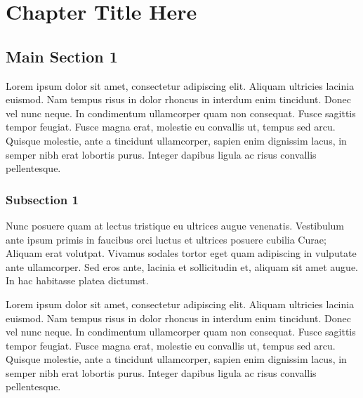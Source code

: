 
\chapter{Chapter Title Here} %

\label{Chapter2} %


\section{Main Section 1}

Lorem ipsum \cite{mwave,pozar,3s2b} dolor sit amet, consectetur adipiscing elit. Aliquam ultricies lacinia euismod. Nam tempus risus in dolor rhoncus in interdum enim tincidunt. Donec vel nunc neque. In condimentum ullamcorper quam non consequat. Fusce sagittis tempor feugiat. Fusce magna erat, molestie eu convallis ut, tempus sed arcu. Quisque molestie, ante a tincidunt ullamcorper, sapien enim dignissim lacus, in semper nibh erat lobortis purus. Integer dapibus ligula ac risus convallis pellentesque.

\subsection{Subsection 1}

\indent Nunc posuere quam at lectus tristique eu ultrices augue venenatis. Vestibulum ante ipsum primis in faucibus orci luctus et ultrices posuere cubilia Curae; Aliquam erat volutpat. Vivamus sodales tortor eget quam adipiscing in vulputate ante ullamcorper. Sed eros ante, lacinia et sollicitudin et, aliquam sit amet augue. In hac habitasse platea dictumst.

Lorem ipsum dolor sit amet, consectetur adipiscing elit. Aliquam ultricies lacinia euismod. Nam tempus risus in dolor rhoncus in interdum enim tincidunt. Donec vel nunc neque. In condimentum ullamcorper quam non consequat. Fusce sagittis tempor feugiat. Fusce magna erat, molestie eu convallis ut, tempus sed arcu. Quisque molestie, ante a tincidunt ullamcorper, sapien enim dignissim lacus, in semper nibh erat lobortis purus. Integer dapibus ligula ac risus convallis pellentesque.

